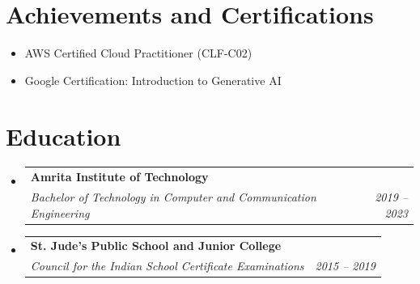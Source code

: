 \documentclass[letterpaper,11pt]{article}
\makeatletter
\newcommand{\resumeItem}[1]{
  \item\small{
    {#1 \vspace{-2pt}}
  }
}
\newcommand{\resumeSubheading}[4]{
  \vspace{-2pt}\item
    \begin{tabular*}{0.97\textwidth}[t]{l@{\extracolsep{\fill}}r}
      \textbf{#1} & #2 \\
      \textit{\small#3} & \textit{\small #4} \\
    \end{tabular*}\vspace{-7pt}
}
\newcommand{\resumeSubHeadingListStart}{\begin{itemize}[leftmargin=0.15in, label={}]}
\newcommand{\resumeSubHeadingListEnd}{\end{itemize}}
\newcommand{\resumeItemListStart}{\begin{itemize}}
\newcommand{\resumeItemListEnd}{\end{itemize}\vspace{-5pt}}
\makeatother
\begin{document}
\section{Achievements and Certifications}
\resumeSubHeadingListStart

\resumeItemListStart

\resumeItem{}{AWS Certified Cloud Practitioner (CLF-C02)}

\resumeItem{}{Google Certification: Introduction to Generative AI}

\resumeItemListEnd

\resumeSubHeadingListEnd

\section{Education}
  \resumeSubHeadingListStart
  
    \resumeSubheading
      {Amrita Institute of Technology}{}
      {Bachelor of Technology in Computer and Communication Engineering}{2019 -- 2023}

    \resumeSubheading
      {St. Jude's Public School and Junior College}{}
      {Council for the Indian School Certificate Examinations}{2015 -- 2019}
  
  \resumeSubHeadingListEnd
\end{document}
